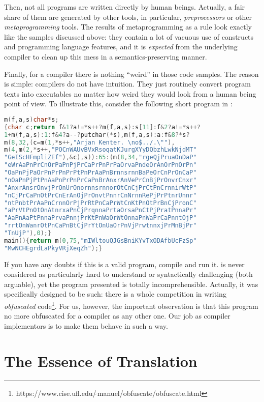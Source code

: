 Then, not all programs are written directly by human beings. Actually, a fair share of them are generated by other tools, in particular, \emph{preprocessors}
or other \emph{metaprogramming} tools. The results of metaprogramming as a rule look exactly like the samples discussed above: they contain a lot
of vacuous use of constructs and programming language features, and it is \emph{expected} from the underlying compiler to clean up this mess
in a semantics-preserving manner.

Finally, for a compiler there is nothing ``weird'' in those code samples. The reason is simple: compilers do not have intuition. They just
routinely convert program texts into executables no matter how weird they would look from a human being point of view. To illustrate this,
consider the following short program in :

\begin{lstlisting}[language=cc]
m(f,a,s)char*s;
{char c;return f&1?a!=*s++?m(f,a,s):s[11]:f&2?a!=*s++?
1+m(f,a,s):1:f&4?a--?putchar(*s),m(f,a,s):a:f&8?*s?
m(8,32,(c=m(1,*s++,"Arjan Kenter. \no$../.\""),
m(4,m(2,*s++,"POCnWAUvBVxRsoqatKJurgXYyDQbzhLwkNjdMT"
"GeIScHFmpliZEf"),&c),s)):65:(m(8,34,"rgeQjPruaOnDaP"
"eWrAaPnPrCnOrPaPnPjPrCaPrPnPrPaOrvaPndeOrAnOrPnOrPn"
"OaPnPjPaOrPnPrPnPrPtPnPrAaPnBrnnsrnnBaPeOrCnPrOnCaP"
"nOaPnPjPtPnAaPnPrPnPrCaPnBrAnxrAnVePrCnBjPrOnvrCnxr"
"AnxrAnsrOnvjPrOnUrOnornnsrnnorOtCnCjPrCtPnCrnnirWtP"
"nCjPrCaPnOtPrCnErAnOjPrOnvtPnnrCnNrnnRePjPrPtnrUnnr"
"ntPnbtPrAaPnCrnnOrPjPrRtPnCaPrWtCnKtPnOtPrBnCjPronC"
"aPrVtPnOtOnAtnrxaPnCjPrqnnaPrtaOrsaPnCtPjPratPnnaPr"
"AaPnAaPtPnnaPrvaPnnjPrKtPnWaOrWtOnnaPnWaPrCaPnntOjP"
"rrtOnWanrOtPnCaPnBtCjPrYtOnUaOrPnVjPrwtnnxjPrMnBjPr"
"TnUjP"),0);}
main(){return m(0,75,"mIWltouQJGsBniKYvTxODAfbUcFzSp"
"MwNCHEgrdLaPkyVRjXeqZh");}
\end{lstlisting}

If you have any doubts if this is a valid  program, compile and run it.  is never considered as particularly hard to
understand or syntactically challenging (both arguable), yet the program presented is totally incomprehensible. Actually, it
was specifically designed to be such: there is a whole competition in writing \emph{obfuscated}
code\footnote{https://www.cise.ufl.edu/$\tilde\,$manuel/obfuscate/obfuscate.html}. For us, however, the important observation is that this
program no more obfuscated for a compiler as any other one. Our job as compiler implementors is to make them behave in such a way.


\section{The Essence of Translation}

